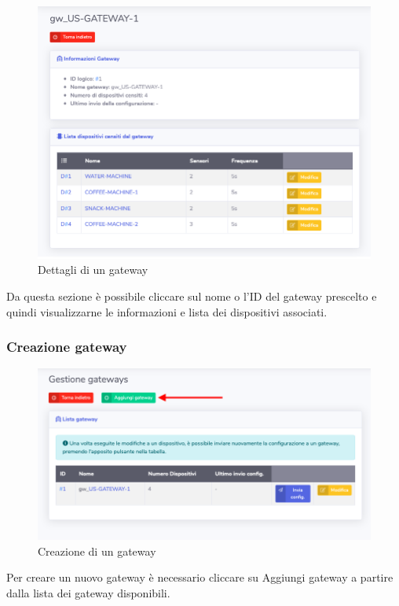 		\begin{figure}[H]
		\centering
		\includegraphics[scale=0.600]{res/images/admin/dettGateway.png}
		\caption{Dettagli di un gateway}
	\end{figure}

		Da questa sezione è possibile cliccare sul nome o l'ID del gateway prescelto e quindi visualizzarne le informazioni e lista dei dispositivi associati.

	\subsubsection{Creazione gateway}

		\begin{figure}[H]
		\centering
		\includegraphics[scale=0.600]{res/images/admin/selCreazGateway.png}
		\caption{Creazione di un gateway}
	\end{figure}


		Per creare un nuovo gateway è necessario cliccare su Aggiungi gateway a partire dalla lista dei gateway disponibili.


